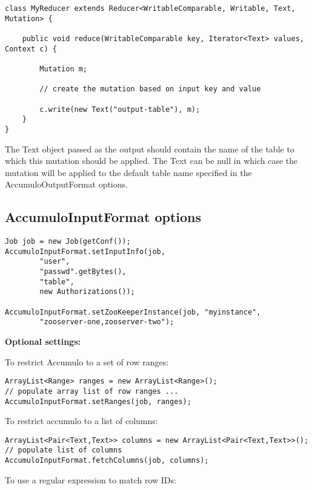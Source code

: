 \small
\begin{verbatim}
class MyReducer extends Reducer<WritableComparable, Writable, Text, Mutation> {

    public void reduce(WritableComparable key, Iterator<Text> values, Context c) {
        
        Mutation m;
        
        // create the mutation based on input key and value
        
        c.write(new Text("output-table"), m);
    }
}
\end{verbatim}
\normalsize

The Text object passed as the output should contain the name of the table to which
this mutation should be applied. The Text can be null in which case the mutation
will be applied to the default table name specified in the AccumuloOutputFormat
options.

\subsection{AccumuloInputFormat options}

\small
\begin{verbatim}
Job job = new Job(getConf());
AccumuloInputFormat.setInputInfo(job,
        "user",
        "passwd".getBytes(),
        "table",
        new Authorizations());

AccumuloInputFormat.setZooKeeperInstance(job, "myinstance",
        "zooserver-one,zooserver-two");
\end{verbatim}

\Large
\textbf{Optional settings:}
\normalsize

To restrict Accumulo to a set of row ranges:

\small
\begin{verbatim}
ArrayList<Range> ranges = new ArrayList<Range>();
// populate array list of row ranges ...
AccumuloInputFormat.setRanges(job, ranges);
\end{verbatim}
\normalsize

To restrict accumulo to a list of columns:

\small
\begin{verbatim}
ArrayList<Pair<Text,Text>> columns = new ArrayList<Pair<Text,Text>>();
// populate list of columns
AccumuloInputFormat.fetchColumns(job, columns);
\end{verbatim}
\normalsize

To use a regular expression to match row IDs:

